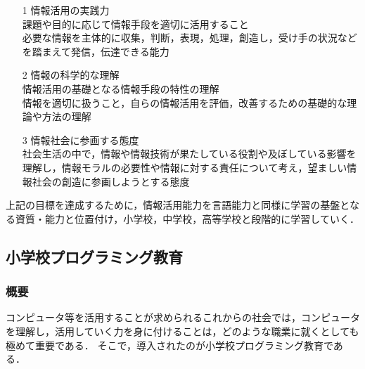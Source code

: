 \documentclass[12pt,a4j,titlepage]{ltjsarticle}
\begin{document}
\begin{enumerate}

\item[1] 情報活用の実践力\mbox{}\\
課題や目的に応じて情報手段を適切に活用すること\\
必要な情報を主体的に収集，判断，表現，処理，創造し，受け手の状況などを踏まえて発信，伝達できる能力

\item[2] 情報の科学的な理解\mbox{}\\
情報活用の基礎となる情報手段の特性の理解\\
情報を適切に扱うこと，自らの情報活用を評価，改善するための基礎的な理論や方法の理解

\item[3] 情報社会に参画する態度\mbox{}\\
社会生活の中で，情報や情報技術が果たしている役割や及ぼしている影響を理解し，情報モラルの必要性や情報に対する責任について考え，望ましい情報社会の創造に参画しようとする態度

\end{enumerate}
上記の目標を達成するために，情報活⽤能⼒を⾔語能⼒と同様に学習の基盤となる資質・能⼒と位置付け，小学校，中学校，高等学校と段階的に学習していく．

\subsection{小学校プログラミング教育}
\subsubsection{概要}
コンピュータ等を活用することが求められるこれからの社会では，コンピュータを理解し，活用していく力を身に付けることは，どのような職業に就くとしても極めて重要である．
そこで，導入されたのが小学校プログラミング教育である\cite{syogaku_pro}．
\end{document}

